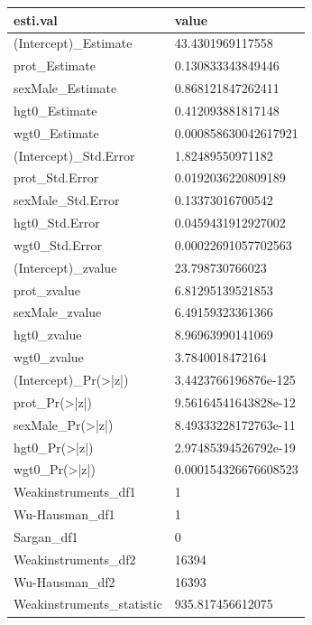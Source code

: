 \documentclass[
]{book}
\begin{document}
\begin{table}[!h]
\centering
\begin{tabular}{l|l}
\hline
esti.val & value\\
\hline
\rowcolor{gray!6}  (Intercept)\_Estimate & 43.4301969117558\\
\hline
prot\_Estimate & 0.130833343849446\\
\hline
\rowcolor{gray!6}  sexMale\_Estimate & 0.868121847262411\\
\hline
hgt0\_Estimate & 0.412093881817148\\
\hline
\rowcolor{gray!6}  wgt0\_Estimate & 0.000858630042617921\\
\hline
(Intercept)\_Std.Error & 1.82489550971182\\
\hline
\rowcolor{gray!6}  prot\_Std.Error & 0.0192036220809189\\
\hline
sexMale\_Std.Error & 0.13373016700542\\
\hline
\rowcolor{gray!6}  hgt0\_Std.Error & 0.0459431912927002\\
\hline
wgt0\_Std.Error & 0.00022691057702563\\
\hline
\rowcolor{gray!6}  (Intercept)\_zvalue & 23.798730766023\\
\hline
prot\_zvalue & 6.81295139521853\\
\hline
\rowcolor{gray!6}  sexMale\_zvalue & 6.49159323361366\\
\hline
hgt0\_zvalue & 8.96963990141069\\
\hline
\rowcolor{gray!6}  wgt0\_zvalue & 3.7840018472164\\
\hline
(Intercept)\_Pr(>|z|) & 3.4423766196876e-125\\
\hline
\rowcolor{gray!6}  prot\_Pr(>|z|) & 9.56164541643828e-12\\
\hline
sexMale\_Pr(>|z|) & 8.49333228172763e-11\\
\hline
\rowcolor{gray!6}  hgt0\_Pr(>|z|) & 2.97485394526792e-19\\
\hline
wgt0\_Pr(>|z|) & 0.000154326676608523\\
\hline
\rowcolor{gray!6}  Weakinstruments\_df1 & 1\\
\hline
Wu-Hausman\_df1 & 1\\
\hline
\rowcolor{gray!6}  Sargan\_df1 & 0\\
\hline
Weakinstruments\_df2 & 16394\\
\hline
\rowcolor{gray!6}  Wu-Hausman\_df2 & 16393\\
\hline
Weakinstruments\_statistic & 935.817456612075\\

\end{tabular}
\end{table}
\end{document}
